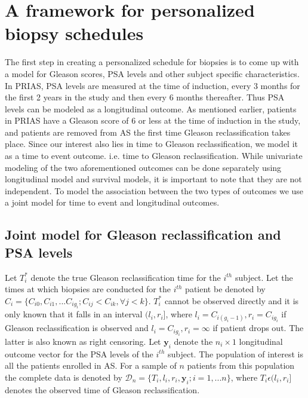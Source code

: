 
\section{A framework for personalized biopsy schedules}
\label{sec : framework_pers_biop_sched}
The first step in creating a personalized schedule for biopsies is to come up with a model for Gleason scores, PSA levels and other subject specific characteristics. In PRIAS, PSA levels are measured at the time of induction, every 3 months for the first 2 years in the study and then every 6 months thereafter. Thus PSA levels can be modeled as a longitudinal outcome. As mentioned earlier, patients in PRIAS have a Gleason score of 6 or less at the time of induction in the study, and patients are removed from AS the first time Gleason reclassification takes place. Since our interest also lies in time to Gleason reclassification, we model it as a time to event outcome. i.e. time to Gleason reclassification. While univariate modeling of the two aforementioned outcomes can be done separately using longitudinal model and survival models, it is important to note that they are not independent. To model the association between the two types of outcomes we use a joint model for time to event and longitudinal outcomes.

\subsection{Joint model for Gleason reclassification and PSA levels}
\label{subsec : jm_definition}
Let $T_i^*$ denote the true Gleason reclassification time for the $i^{th}$ subject. Let the times at which biopsies are conducted for the $i^{th}$ patient be denoted by $C_i = \{C_{i0}, C_{i1}, ... C_{ig_i}; C_{ij} < C_{ik}, \forall j<k \}$. $T_i^*$ cannot be observed directly and it is only known that it falls in an interval $(l_i, r_i]$, where $l_i = C_{i(g_i-1)}, r_i = C_{ig_i}$ if Gleason reclassification is observed and $l_i = C_{ig_i}, r_i=\infty$ if patient drops out. The latter is also known as right censoring. Let $\boldsymbol{y}_i$ denote the $n_i \times 1$ longitudinal outcome vector for the PSA levels of the $i^{th}$ subject. The population of interest is all the patients enrolled in AS. For a sample of $n$ patients from this population the complete data is denoted by $\mathcal{D}_n = \{T_i, l_i, r_i, \boldsymbol{y}_i; i = 1,...n\}$, where $T_i \epsilon (l_i, r_i]$ denotes the observed time of Gleason reclassification.\\

